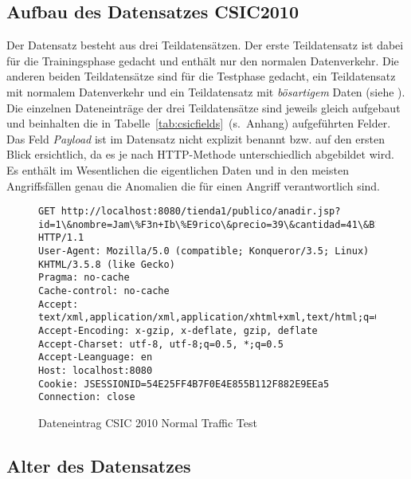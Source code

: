 %

\subsection{Aufbau des Datensatzes CSIC2010}


Der Datensatz besteht aus drei Teildatensätzen. Der erste Teildatensatz ist dabei für die Trainingsphase gedacht und enthält nur den normalen Datenverkehr. Die anderen beiden Teildatensätze sind für die Testphase gedacht, ein Teildatensatz mit normalem Datenverkehr und ein Teildatensatz mit \emph{bösartigem} Daten (siehe \cite{csic2010}). Die einzelnen Dateneinträge der drei Teildatensätze sind jeweils gleich aufgebaut und beinhalten die in Tabelle~\ref{tab:csicfields}~(s.~Anhang) aufgeführten Felder. Das Feld \emph{Payload} ist im Datensatz nicht explizit benannt bzw. auf den ersten Blick ersichtlich, da es je nach HTTP-Methode unterschiedlich abgebildet wird. Es enthält im Wesentlichen die eigentlichen Daten und in den meisten Angriffsfällen genau die Anomalien die für einen Angriff verantwortlich sind.

      \begin{figure}
        \caption{Dateneintrag CSIC 2010 Normal Traffic Test}
        \label{fig:csisexample}
        \begin{lstlisting}
GET http://localhost:8080/tienda1/publico/anadir.jsp?id=1\&nombre=Jam\%F3n+Ib\%E9rico\&precio=39\&cantidad=41\&B1=A\%F1adir+al+carrito HTTP/1.1
User-Agent: Mozilla/5.0 (compatible; Konqueror/3.5; Linux) KHTML/3.5.8 (like Gecko)
Pragma: no-cache
Cache-control: no-cache
Accept: text/xml,application/xml,application/xhtml+xml,text/html;q=0.9;text/plain;q=0.8,image/png,*/*;q=0.5
Accept-Encoding: x-gzip, x-deflate, gzip, deflate
Accept-Charset: utf-8, utf-8;q=0.5, *;q=0.5
Accept-Leanguage: en
Host: localhost:8080
Cookie: JSESSIONID=54E25FF4B7F0E4E855B112F882E9EEa5
Connection: close
\end{lstlisting}
\end{figure}


\subsection{Alter des Datensatzes}

